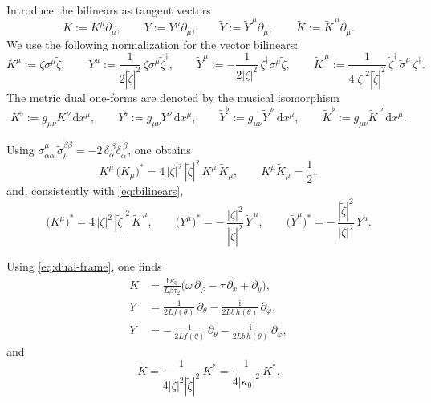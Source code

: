 \documentclass[11pt,a4paper]{article}
\numberwithin{equation}{section}
\theoremstyle{plain}
\theoremstyle{definition}
\theoremstyle{remark}
\newcommand{\ii}{\mathrm{i}}
\newcommand{\dd}{\mathrm{d}}
\begin{document}
Introduce the bilinears as tangent vectors
\begin{equation}
K := K^\mu\partial_\mu,\qquad
Y := Y^\mu\partial_\mu,\qquad
\widetilde Y := \widetilde Y^{\,\mu}\partial_\mu,\qquad
\widetilde K := \widetilde K^{\,\mu}\partial_\mu.
\label{eq:vectors}
\end{equation}
We use the following normalization for the vector bilinears:
\begin{equation}
K^\mu := \zeta\sigma^\mu\widetilde\zeta,
\qquad
Y^\mu := \frac{1}{2|\widetilde\zeta|^2}\,\zeta\sigma^\mu\widetilde\zeta^\dagger,
\qquad
\widetilde Y^\mu := -\frac{1}{2|\zeta|^2}\,\zeta^\dagger\sigma^\mu\widetilde\zeta,
\qquad
\widetilde K^{\,\mu} := \frac{1}{4|\zeta|^2|\widetilde\zeta|^2}\,\widetilde\zeta^\dagger\,\widetilde\sigma^\mu\,\zeta^\dagger.
\label{eq:bilinears}
\end{equation}
The metric dual one-forms are denoted by the musical isomorphism
\begin{equation}
K^\flat := g_{\mu\nu}K^\nu\,\dd x^\mu,\qquad
Y^\flat := g_{\mu\nu}Y^\nu\,\dd x^\mu,\qquad
\widetilde Y^\flat := g_{\mu\nu}\widetilde Y^{\,\nu}\,\dd x^\mu,\qquad
\widetilde K^\flat := g_{\mu\nu}\widetilde K^{\,\nu}\,\dd x^\mu.
\label{eq:flat}
\end{equation}


Using $\sigma^\mu_{\alpha\dot\alpha}\,\widetilde\sigma_{\mu}^{\dot\beta\beta}
=-2\,\delta_\alpha^{\ \beta}\delta_{\dot\alpha}^{\ \dot\beta}$, one obtains
\begin{equation}
K^\mu\,\big(K_\mu\big)^\ast = 4\,|\zeta|^2\,|\widetilde\zeta|^2\,K^\mu\,\widetilde K_\mu,
\qquad
K^\mu \widetilde K_\mu=\frac12,
\label{eq:Ktilde-norm}
\end{equation}
and, consistently with \eqref{eq:bilinears},
\begin{equation}
\big(K^\mu\big)^\ast = 4\,|\zeta|^2\,|\widetilde\zeta|^2\,\widetilde K^{\,\mu},
\qquad
\big(Y^\mu\big)^\ast = -\,\frac{|\zeta|^2}{|\widetilde\zeta|^2}\,\widetilde Y^{\,\mu},
\qquad
\big(\widetilde Y^\mu\big)^\ast = -\,\frac{|\widetilde\zeta|^2}{|\zeta|^2}\,Y^\mu.
\label{eq:conjugation}
\end{equation}


Using \eqref{eq:dual-frame}, one finds
\begin{align}
K &= \frac{\ii\,\kappa_0}{L\beta\tau_2}\Big(\omega\,\partial_\varphi-\tau\,\partial_x+\partial_y\Big),
\label{eq:Kcoord}\\
Y &= \frac{1}{2L f(\theta)}\,\partial_\theta-\frac{\ii}{2 L b\,h(\theta)}\,\partial_\varphi,
\label{eq:Ycoord}\\
\widetilde Y &= -\,\frac{1}{2L f(\theta)}\,\partial_\theta-\frac{\ii}{2 L b\,h(\theta)}\,\partial_\varphi,
\label{eq:Ytilcoord}
\end{align}
and
\begin{equation}
\widetilde K = \frac{1}{4|\zeta|^2|\widetilde\zeta|^2}\,K^\ast
=\frac{1}{4|\kappa_0|^2}\,K^\ast.
\label{eq:Ktilcoord}
\end{equation}
\end{document}
